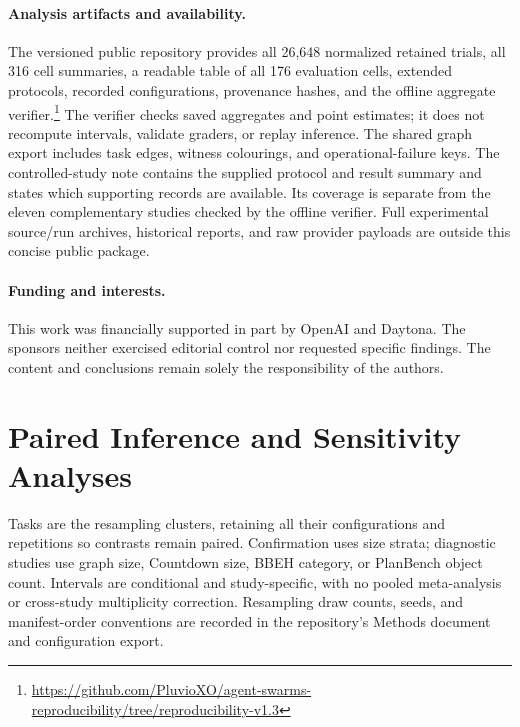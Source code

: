 \paragraph{Analysis artifacts and availability.}
The versioned public repository provides all 26,648 normalized retained
trials, all 316 cell summaries, a readable table of all 176 evaluation cells,
extended protocols, recorded configurations, provenance hashes, and the
offline aggregate verifier.\footnote{\url{https://github.com/PluvioXO/agent-swarms-reproducibility/tree/reproducibility-v1.3}}
The verifier checks saved aggregates and point estimates; it does not
recompute intervals, validate graders, or replay inference. The shared graph
export includes task edges, witness colourings, and operational-failure keys.
The controlled-study note contains the supplied protocol and result summary
and states which supporting records are available. Its coverage is separate
from the eleven complementary studies checked by the offline verifier.
Full experimental source/run archives, historical reports, and raw provider payloads are
outside this concise public package.

\paragraph{Funding and interests.}
This work was financially supported in part by OpenAI and Daytona. The
sponsors neither exercised editorial control nor requested specific findings.
The content and conclusions remain solely the responsibility of the authors.

\section{Paired Inference and Sensitivity Analyses}
\label{app:inference}
Tasks are the resampling clusters, retaining all their configurations and
repetitions so contrasts remain paired. Confirmation uses size strata;
diagnostic studies use graph size, Countdown size, BBEH category, or PlanBench
object count. Intervals are conditional and study-specific, with no pooled
meta-analysis or cross-study multiplicity correction. Resampling draw counts,
seeds, and manifest-order conventions are recorded in the repository's
Methods document and configuration export.


